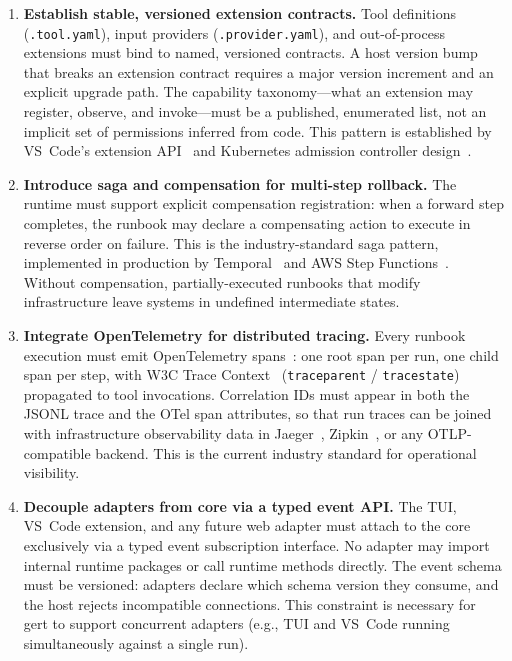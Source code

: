 \begin{enumerate}[label=\textbf{G\arabic*.}]
  \item \textbf{Establish stable, versioned extension contracts.}
    Tool definitions (\texttt{.tool.yaml}), input providers (\texttt{.provider.yaml}), and
    out-of-process extensions must bind to named, versioned contracts. A host version bump that breaks
    an extension contract requires a major version increment and an explicit upgrade path. The capability
    taxonomy---what an extension may register, observe, and invoke---must be a published, enumerated
    list, not an implicit set of permissions inferred from code. This pattern is established by
    VS~Code's extension API~\cite{vscode-extension-api} and Kubernetes admission controller design~\cite{kubernetes-docs}.

  \item \textbf{Introduce saga and compensation for multi-step rollback.}
    The runtime must support explicit compensation registration: when a forward step completes, the runbook may
    declare a compensating action to execute in reverse order on failure. This is the industry-standard
    saga pattern, implemented in production by Temporal~\cite{temporal-docs} and AWS Step Functions~\cite{aws-step-functions}. Without compensation,
    partially-executed runbooks that modify infrastructure leave systems in undefined intermediate
    states.

  \item \textbf{Integrate OpenTelemetry for distributed tracing.}
    Every runbook execution must emit OpenTelemetry spans~\cite{otel-spec}: one root span per run, one child span per
    step, with W3C Trace Context~\cite{w3c-trace-context} (\texttt{traceparent} / \texttt{tracestate}) propagated to tool
    invocations. Correlation IDs must appear in both the JSONL trace and the OTel span attributes, so
    that run traces can be joined with infrastructure observability data in Jaeger~\cite{jaeger-docs}, Zipkin~\cite{zipkin-docs}, or any
    OTLP-compatible backend. This is the current industry standard for operational visibility.

  \item \textbf{Decouple adapters from core via a typed event API.}
    The TUI, VS~Code extension, and any future web adapter must attach to the core exclusively via a
    typed event subscription interface. No adapter may import internal runtime packages or call runtime
    methods directly. The event schema must be versioned: adapters declare which schema version they
    consume, and the host rejects incompatible connections. This constraint is necessary for gert to
    support concurrent adapters (e.g., TUI and VS~Code running simultaneously against a single run).

\end{enumerate}


